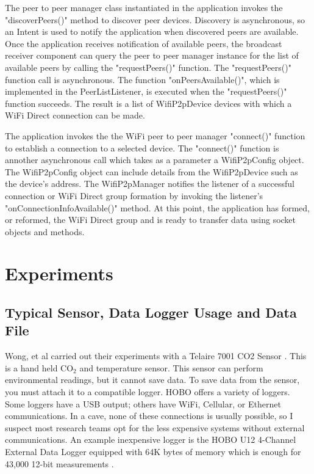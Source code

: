 \documentclass[10pt,twocolumn]{article}
\begin{document}
The peer to peer manager class instantiated in the application invokes the "discoverPeers()" method to discover peer devices.
Discovery is asynchronous, so an Intent is used to notify the application when discovered peers are available.
Once the application receives notification of available peers, the broadcast receiver component can query the peer to peer manager instance for the list of available peers by calling the "requestPeers()" function.
The "requestPeers()" function call is asynchronous.
The function "onPeersAvailable()", which is implemented in the PeerListListener, is executed when the "requestPeers()" function succeeds. 
The result is a list of WifiP2pDevice devices with which a WiFi Direct connection can be made. \cite{androidp2p}

The application invokes the the WiFi peer to peer manager "connect()" function to establish a connection to a selected device.
The "connect()" function is annother asynchronous call which takes as a parameter a WifiP2pConfig object.
The WifiP2pConfig object can include details from the WifiP2pDevice such as the device's address.
The WifiP2pManager notifies the listener of a successful connection or WiFi Direct group formation by invoking the listener's "onConnectionInfoAvailable()" method.
At this point, the application has formed, or reformed, the WiFi Direct group and is ready to transfer data using socket objects and methods.

\section{Experiments}

\subsection{Typical Sensor, Data Logger Usage and Data File}
\label{sec:TypicalUsage}
Wong, et al carried out their experiments with a Telaire 7001 CO2 Sensor \cite{telaire} \cite{wong2010}. 
This is a hand held CO$_2$ and temperature sensor.
This sensor can perform environmental readings, but it cannot save data.
To save data from the sensor, you must attach it to a compatible logger.
HOBO offers a variety of loggers.
Some loggers have a USB output; others have WiFi, Cellular, or Ethernet communications.
In a cave, none of these connections is usually possible, so I suspect most research teams opt for the less expensive systems without external communications.
An example inexpensive logger is the HOBO U12 4-Channel External Data Logger equipped with 64K bytes of memory which is enough for 43,000 12-bit measurements \cite{logger}. 
\end{document}
